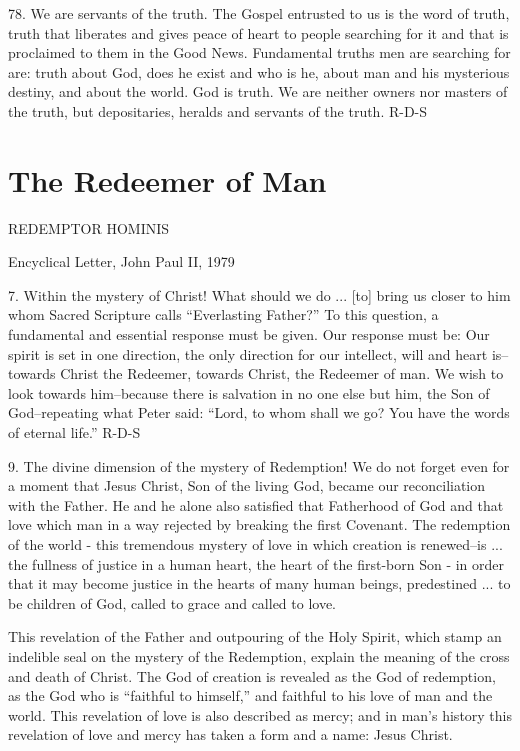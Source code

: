 \documentclass[oneside]{book}
\begin{document}
78. We are servants of the truth. The Gospel entrusted to us is the word of
truth, truth that liberates and gives peace of heart to people searching for it
and that is proclaimed to them in the Good News. Fundamental truths men are
searching for are: truth about God, does he exist and who is he, about man and
his mysterious destiny, and about the world. God is truth. We are neither owners
nor masters of the truth, but depositaries, heralds and servants of the truth.
R-D-S


\chapter{The Redeemer of Man}

REDEMPTOR HOMINIS

Encyclical Letter, John Paul II, 1979


7. Within the mystery of Christ! What should we do ... [to] bring us closer to
him whom Sacred Scripture calls ``Everlasting Father?'' To this question, a
fundamental and essential response must be given. Our response must be: Our
spirit is set in one direction, the only direction for our intellect, will and
heart is--towards Christ the Redeemer, towards Christ, the Redeemer of man. We
wish to look towards him--because there is salvation in no one else but him, the
Son of God--repeating what Peter said: ``Lord, to whom shall we go? You have the
words of eternal life.''
R-D-S

9. The divine dimension of the mystery of Redemption! We do not forget even for
a moment that Jesus Christ, Son of the living God, became our reconciliation
with the Father. He and he alone also satisfied that Fatherhood of God and that
love which man in a way rejected by breaking the first Covenant. The redemption
of the world - this tremendous mystery of love in which creation is renewed--is
... the fullness of justice in a human heart, the heart of the first-born Son -
in order that it may become justice in the hearts of many human beings,
predestined ... to be children of God, called to grace and called to love.

This revelation of the Father and outpouring of the Holy Spirit, which stamp an
indelible seal on the mystery of the Redemption, explain the meaning of the
cross and death of Christ. The God of creation is revealed as the God of
redemption, as the God who is ``faithful to himself,'' and faithful to his love
of man and the world. This revelation of love is also described as mercy; and in
man's history this revelation of love and mercy has taken a form and a name:
Jesus Christ.
\end{document}
